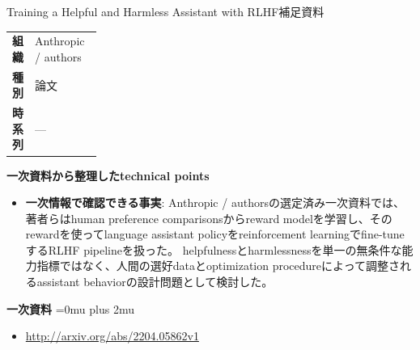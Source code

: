 \begin{technicalnote}{Training a Helpful and Harmless Assistant with RLHF}{補足資料}
\begingroup
\begin{tabularx}{\linewidth}{@{}>{\bfseries}p{0.22\linewidth}X@{}}
組織 & Anthropic / authors \\
種別 & 論文 \\
時系列 & — \\
\end{tabularx}
\smallskip
{\bfseries 一次資料から整理したtechnical points}
\begin{itemize}[leftmargin=1.5em,itemsep=0.35em]
\item \textbf{一次情報で確認できる事実}: Anthropic / authorsの選定済み一次資料では、著者らはhuman preference comparisonsからreward modelを学習し、そのrewardを使ってlanguage assistant policyをreinforcement learningでfine-tuneするRLHF pipelineを扱った。 helpfulnessとharmlessnessを単一の無条件な能力指標ではなく、人間の選好dataとoptimization procedureによって調整されるassistant behaviorの設計問題として検討した。
\end{itemize}
\begin{minipage}{\linewidth}
\begin{samepage}
{\bfseries 一次資料}
\begingroup\sloppy
\Urlmuskip=0mu plus 2mu\relax
\begin{itemize}[leftmargin=1.5em,itemsep=0.25em]
\item {\scriptsize\url{http://arxiv.org/abs/2204.05862v1}}
\end{itemize}
\endgroup
\end{samepage}
\end{minipage}
\endgroup
\end{technicalnote}
\medskip

